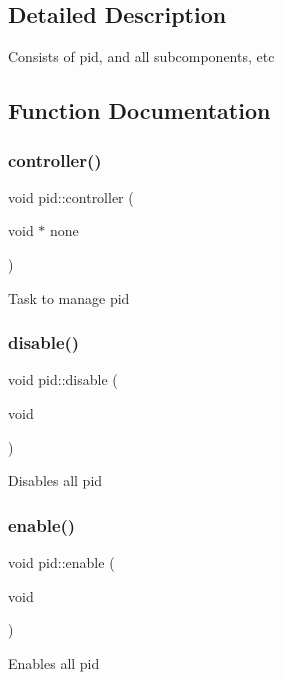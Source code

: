 \subsection{Detailed Description}
Consists of pid, and all subcomponents, etc 

\subsection{Function Documentation}
\mbox{\label{namespacepid_ab65dc5974d66ecc9406878a375244f20}} 
\subsubsection{\texorpdfstring{controller()}{controller()}}
{\footnotesize\ttfamily void pid\+::controller (\begin{DoxyParamCaption}\item[{void $\ast$}]{none }\end{DoxyParamCaption})}

Task to manage pid \mbox{\label{namespacepid_aba928d2e1b704af6cf1e652224411be5}} 
\subsubsection{\texorpdfstring{disable()}{disable()}}
{\footnotesize\ttfamily void pid\+::disable (\begin{DoxyParamCaption}\item[{void}]{ }\end{DoxyParamCaption})}

Disables all pid \mbox{\label{namespacepid_a4a4e5d1d2391a4ce24308442c4d69723}} 
\subsubsection{\texorpdfstring{enable()}{enable()}}
{\footnotesize\ttfamily void pid\+::enable (\begin{DoxyParamCaption}\item[{void}]{ }\end{DoxyParamCaption})}

Enables all pid \mbox{\label{namespacepid_a3a4e4a51df909f0aa3b2df01d35ff75b}} 
